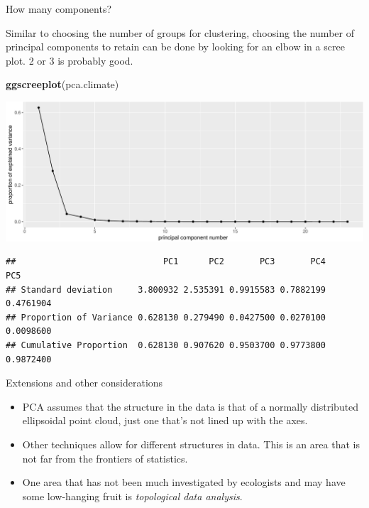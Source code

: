 \documentclass[
  ignorenonframetext,
]{beamer}
\newenvironment{Shaded}{\begin{snugshade}}{\end{snugshade}}
\newcommand{\DecValTok}[1]{\textcolor[rgb]{0.00,0.00,0.81}{#1}}
\newcommand{\KeywordTok}[1]{\textcolor[rgb]{0.13,0.29,0.53}{\textbf{#1}}}
\newcommand{\NormalTok}[1]{#1}
\newcommand{\OperatorTok}[1]{\textcolor[rgb]{0.81,0.36,0.00}{\textbf{#1}}}
\providecommand{\tightlist}{%
  \setlength{\itemsep}{0pt}\setlength{\parskip}{0pt}}
\begin{document}
\begin{frame}[fragile]{How many components?}
\protect\hypertarget{how-many-components}{}

Similar to choosing the number of groups for clustering, choosing the
number of principal components to retain can be done by looking for an
elbow in a scree plot. 2 or 3 is probably good. \scriptsize

\begin{Shaded}
\begin{Highlighting}[]
\KeywordTok{ggscreeplot}\NormalTok{(pca.climate)}
\end{Highlighting}
\end{Shaded}

\includegraphics{unsupervised_learning_files/figure-beamer/unnamed-chunk-21-1.pdf}

\begin{Shaded}
\end{Shaded}

\begin{verbatim}
##                             PC1      PC2       PC3       PC4       PC5
## Standard deviation     3.800932 2.535391 0.9915583 0.7882199 0.4761904
## Proportion of Variance 0.628130 0.279490 0.0427500 0.0270100 0.0098600
## Cumulative Proportion  0.628130 0.907620 0.9503700 0.9773800 0.9872400
\end{verbatim}

\end{frame}

\begin{frame}{Extensions and other considerations}
\protect\hypertarget{extensions-and-other-considerations-1}{}

\begin{itemize}
\tightlist
\item
  PCA assumes that the structure in the data is that of a normally
  distributed ellipsoidal point cloud, just one that's not lined up with
  the axes.
\item
  Other techniques allow for different structures in data. This is an
  area that is not far from the frontiers of statistics.
\item
  One area that has not been much investigated by ecologists and may
  have some low-hanging fruit is \emph{topological data analysis}.
\end{itemize}

\end{frame}
\end{document}
